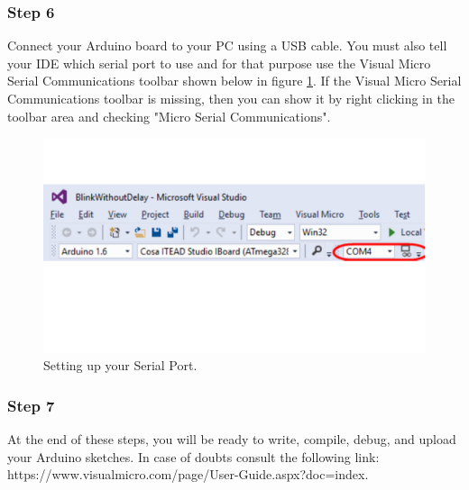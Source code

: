 \begin{refsection}
	\subsubsection{Step 6}
	
	Connect your Arduino board to your PC using a USB cable. You must also tell your IDE which serial port to use and for that purpose use the Visual Micro Serial Communications toolbar shown below in figure \ref{selectSerial}. If the Visual Micro Serial Communications toolbar is missing, then you can show it by right clicking in the toolbar area and checking "Micro Serial Communications".
	
	\begin{figure}[H]
		\centering
		\includegraphics[width=0.7\linewidth]{./sdf/arduino_quantum_rx/figures/selectSerial.pdf}
		\caption{Setting up your Serial Port.}
		\label{selectSerial}
	\end{figure}
	
	\subsubsection{Step 7}
	At the end of these steps, you will be ready to write, compile, debug, and upload your Arduino sketches. In case of doubts consult the following link: https://www.visualmicro.com/page/User-Guide.aspx?doc=index.
	
	\clearpage
	\printbibliography[heading=subbibliography]
\end{refsection}
\cleardoublepage

